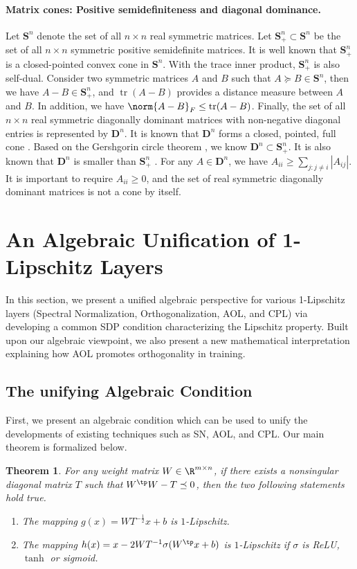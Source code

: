 \documentclass{article} \usepackage{iclr2023_conference,times}
\newcommand{\SC}{\mathbf{S}}
\newcommand{\D}{\mathbf{D}}
\newtheorem{theorem}{Theorem}
\DeclareMathOperator*{\tr}{tr}
\newcommand{\0}{\mathbf{0} }
\begin{document}
\paragraph{Matrix cones: Positive semidefiniteness and diagonal dominance.} 
Let $\SC^n$ denote the set of all $n\times n$ real symmetric matrices. Let $\SC_+^n\subset\SC^n$ be the set of all $n\times n$ symmetric positive semidefinite matrices. It is well known that $\SC_+^n$ is a closed-pointed convex cone in $\SC^n$. With the trace inner product, $\SC_+^n$ is also self-dual. Consider two symmetric matrices $A$ and $B$ such that $A\succeq B\in \SC^n$, then we have $A-B\in \SC_+^n$, and $\tr(A-B)$ provides a distance measure between $A$ and $B$. In addition, we have $\norm{A-B}_F\le \tr(A-B)$. 
Finally, the set of all $n\times n$ real symmetric diagonally dominant matrices with non-negative diagonal entries is represented by $\D^n$. It is known that $\D^n$ forms a closed, pointed, full cone \citep{barker1975cones}. Based on the Gershgorin circle theorem \citep{horn2012matrix}, we know $\D^n\subset \SC_+^n$. It is also known that $\D^n$ is smaller than $\SC_+^n$ \citep{barker1975cones}. 
For any $A\in \D^n$, we have $A_{ii}\ge \sum_{j:j\neq i}|A_{ij}|$. 
It is important to require $A_{ii}\ge 0$, and the set of real symmetric diagonally dominant matrices is not  a cone by itself. 



\section{An Algebraic Unification of 1-Lipschitz Layers}

In this section, we present a unified algebraic perspective for various 1-Lipschitz layers (Spectral Normalization, Orthogonalization, AOL, and CPL) via developing a common SDP condition characterizing the Lipschitz property.  Built upon our algebraic viewpoint, we also present a new mathematical interpretation explaining how AOL promotes orthogonality in training.

\subsection{The unifying  Algebraic Condition}
First, we present an algebraic condition which can be used to unify the developments of existing techniques such as SN, AOL, and CPL. Our main theorem is formalized below.

\begin{theorem}\label{thm:main1}
For any weight matrix $W\in \R^{m\times n}$, if there exists a nonsingular diagonal matrix $T$ such that $W^\tp W-T\preceq 0$, then the two following statements hold true. 
\begin{enumerate}
  \item The mapping $g(x)=WT^{-\frac{1}{2}}x+b$  is $1$-Lipschitz.
  \item The mapping $h(x)=x-2W T^{-1} \sigma (W^\tp x+b)$ is $1$-Lipschitz if $\sigma$ is ReLU, $\tanh$ or sigmoid.
\end{enumerate}
\end{theorem}
\end{document}
